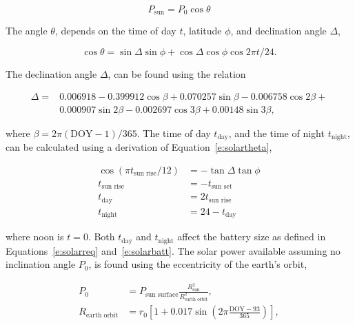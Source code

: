 \begin{equation}
    \label{e:solarp}
    P_{\text{sun}} = P_0 \cos{\theta}
\end{equation}

The angle $\theta$, depends on the time of day $t$, latitude $\phi$, and declination angle $\Delta$,\cite{solar}

    \begin{equation}
        \label{e:solartheta}
        \cos{\theta} = \sin{\Delta} \sin{\phi} + \cos{\Delta} \cos{\phi} \cos{2\pi t/24}.
    \end{equation}

 The declination angle $\Delta$, can be found using the relation\cite{solar} 

    \begin{align}
        \label{e:solardelta}
        \Delta = &0.006918 - 0.399912 \cos{\beta} + 0.070257\sin{\beta} - 0.006758\cos{2\beta} + \nonumber \\
        & 0.000907\sin{2\beta} - 0.002697\cos{3\beta} + 0.00148\sin{3\beta},
    \end{align}

    where $\beta = 2\pi (\text{DOY}-1)/365$.
    The time of day $t_{\text{day}}$, and the time of night $t_{\text{night}}$, can be calculated using a derivation of Equation~\eqref{e:solartheta}, \cite{solar}

    \begin{align}
        \label{e:solartday}
        \cos{(\pi t_{\text{sun rise}}/12)} &= -\tan{\Delta} \tan{\phi} \\
        \label{e:solarsunrise}
        t_{\text{sun rise}} &= -t_{\text{sun set}} \\
        \label{e:solartday2}
        t_{\text{day}} &= 2t_{\text{sun rise}} \\
        \label{e:solartnight}
        t_{\text{night}} &= 24 - t_{\text{day}}
    \end{align}

    where noon is $t=0$. Both $t_{\text{day}}$ and $t_{\text{night}}$ affect the battery size as defined in Equations~\eqref{e:solarreq} and~\eqref{e:solarbatt}. The solar power available assuming no inclination angle $P_0$, is found using the eccentricity of the earth's orbit, 

    \begin{align}
        \label{e:solarp0}
        P_0 & = P_{\text{sun surface}} \frac{R_{\text{sun}}^2}{R_{\text{earth orbit}}^2}, \\
        \label{e:solareo}
        R_{\text{earth orbit}} & = r_0 \left[ 1 + 0.017 \sin{\left( 2\pi \frac{\text{DOY}-93}{365}\right)} \right],
    \end{align}
    
